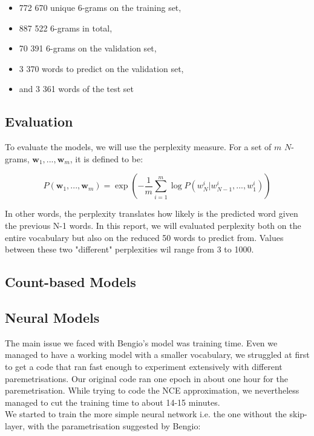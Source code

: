 \documentclass[11pt]{article}
\begin{document}
\begin{itemize}
\item 772 670 unique 6-grams on the training set,
\item 887 522 6-grams in total,
\item 70 391 6-grams on the validation set,
\item 3 370 words to predict on the validation set,
\item and 3 361 words of the test set
\end{itemize}

\subsection{Evaluation}

To evaluate the models, we will use the perplexity measure. For a set of $m$ $N$-grams, $\boldsymbol{w}_1,...,\boldsymbol{w}_m$, it is defined to be:

$$ P(\boldsymbol{w}_1,...,\boldsymbol{w}_m) = \exp\left(-\frac{1}{m} \sum\limits_{i = 1}^{m} \log P(w_N^i|w_{N-1}^i,...,w_1^i)\right)$$

\noindent In other words, the perplexity translates how likely is the predicted word given the previous N-1 words. In this report, we will evaluated perplexity both on the entire vocabulary but also on the reduced 50 words to predict from. Values between these two "different" perplexities wil range from 3 to 1000.
\subsection{Count-based Models}

\subsection{Neural Models}

The main issue we faced with Bengio's model was training time. Even we managed to have a working model with a smaller vocabulary, we struggled at first to get a code that ran fast enough to experiment extensively with different paremetrisations. Our original code ran one epoch in about one hour for the paremetrisation. While trying to code the NCE approximation, we nevertheless managed to cut the training time to about 14-15 minutes.\\

We started to train the more simple neural network i.e. the one without the skip-layer, with the parametrisation suggested by Bengio:
\end{document}
